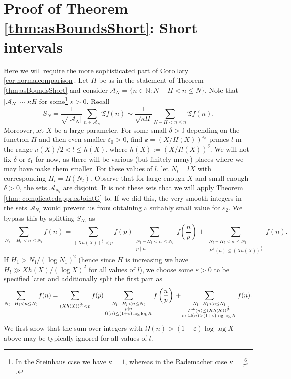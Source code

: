 \documentclass[11pt]{tran-l}
\theoremstyle{definition}
\theoremstyle{remark}
\numberwithin{equation}{section}
\begin{document}
\section{Proof of Theorem \ref{thm:asBoundsShort}: Short intervals} Here we will require the more sophisticated part of Corollary \ref{cor:normalcomparison}. Let $H$ be as in the statement of Theorem \ref{thm:asBoundsShort} and consider $\mathcal A_N = \{n\in\mathbb N : N-H<n\leq N\}$. Note that $\lvert\mathcal A_N\rvert\sim \kappa H$ for some\footnote{In the Steinhaus case we have $\kappa = 1$, whereas in the Rademacher case $\kappa = \frac{6}{\pi^2}$.} $\kappa>0$. Recall 
\begin{equation*}
    S_N = \frac{1}{\sqrt{\lvert\mathcal A_N\rvert}}\sum_{n\in\mathcal A_N} \mathfrak Tf(n)\sim \frac{1}{\sqrt{\kappa H}}\sum_{N-H<n\leq n }\mathfrak Tf(n).
\end{equation*}
Moreover, let $X$ be a large parameter. For some small $\delta>0$ depending on the function $H$ and then even smaller $\varepsilon_0>0$, find $k= (X/H(X))^{\varepsilon_0}$ primes $l$ in the range $h(X)/2<l\leq h(X)$, where $h(X) := (X/H(X))^{\delta}$. We will not fix $\delta$ or $\varepsilon_0$ for now, as there will be various (but finitely many) places where we may have make them smaller. For these values of $l$, let $N_l = lX$ with corresponding $H_l = H(N_l)$. 
Observe that for large enough $X$ and small enough $\delta>0$, the sets $\mathcal A_{N_l}$ are disjoint. It is not these sets that we will apply Theorem \ref{thm: complicatedapproxJointG} to. If we did this, the very smooth integers in the sets $\mathcal A_{N_l}$ would prevent us from obtaining a suitably small value for $\varepsilon_2$. We bypass this by splitting $S_{N_l}$ as 
\begin{equation}\label{eq:splitting1}
    \sum_{N_l - H_l<n\leq N_l}f(n) = \sum_{(Xh(X))^{\frac{2}{3}}< p}f(p)\sum_{\substack{N_l-H_l < n\leq N_l \\ p\mid n}}f\left(\frac np\right) + \sum_{\substack{N_l-H_l<n\leq N_l \\ P^+(n)\leq (Xh(X))^{\frac{2}{3}}}}f(n).
\end{equation}
If $H_1> N_1/(\log N_1)^2$ (hence since $H$ is increasing we have $H_l \gg Xh(X)/(\log X)^2$ for all values of $l$), we choose some $\varepsilon>0$ to be specified later and additionally split the first part as 
\begin{equation}\label{eq:splitting2}
    \sum_{N_l - H_l<n\leq N_l}f(n) = \sum_{(Xh(X))^{\frac{2}{3}}< p }f(p)\sum_{\substack{N_l-H_l < n\leq N_l \\ p\mid n \\ \Omega(n)\leq (1+\varepsilon)\log\log X}}f\left(\frac np\right) \\ + \sum_{\substack{N_l-H_l<n\leq N_l \\  P^+(n)\leq (Xh(X))^{\frac{2}{3}} \\ \text{or } \Omega(n)> (1+\varepsilon)\log\log X }}f(n).
\end{equation}
We first show that the sum over integers with $\Omega(n)> (1+\varepsilon)\log\log X$ above may be typically ignored for all values of $l$. 
\end{document}
